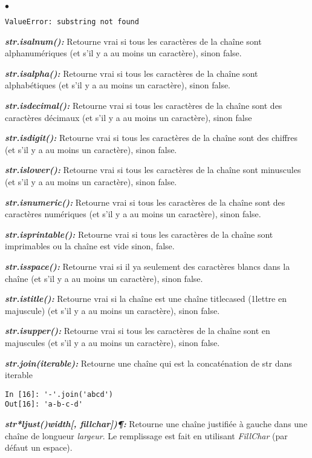 \documentclass[10pt,dvipsnames,  dvips]{article}
\begin{document}
\begin{list}{$\bullet$}{}
\begin{lstlisting}
ValueError: substring not found
\end{lstlisting}

\item \textit{\textbf{str.isalnum(): }} Retourne vrai si tous les caractères de la chaîne sont alphanumériques (et s'il y a au moins un caractère), sinon false.
\item \textit{\textbf{str.isalpha(): }} Retourne vrai si tous les caractères de la chaîne sont alphabétiques (et s'il y a au moins un caractère), sinon false.
\item \textit{\textbf{str.isdecimal(): }} Retourne vrai si tous les caractères de la chaîne sont des caractères décimaux (et s'il y a au moins un caractère), sinon false
\item \textit{\textbf{str.isdigit(): }} Retourne vrai si tous les caractères de la chaîne sont des chiffres (et s'il y a au moins un caractère), sinon false.
\item \textit{\textbf{str.islower(): }}Retourne vrai si tous les caractères de la chaîne sont minuscules (et s'il y a au moins un caractère), sinon false.
\item \textit{\textbf{str.isnumeric(): }}Retourne vrai si tous les caractères de la chaîne sont des caractères numériques (et s'il y a au moins un caractère), sinon false.
\item \textit{\textbf{str.isprintable(): }}Retourne vrai si tous les caractères de la chaîne sont imprimables ou la chaîne est vide sinon, false.
\item \textit{\textbf{str.isspace(): }}Retourne vrai si il ya seulement des caractères blancs dans la chaîne (et s'il y a au moins un caractère), sinon false.
\item \textit{\textbf{str.istitle(): }}Retourne vrai si la chaîne est une chaîne titlecased (1\ier lettre en majuscule) (et s'il y a au moins un caractère), sinon false.
\item \textit{\textbf{str.isupper(): }}Retourne vrai si tous les caractères de la chaîne sont en majuscules (et s'il y a au moins un caractère), sinon false.
\item \textit{\textbf{str.join(iterable): }}Retourne une chaîne qui est la concaténation de str dans iterable
\begin{lstlisting}
In [16]: '-'.join('abcd')
Out[16]: 'a-b-c-d'
\end{lstlisting}
\item \textit{\textbf{ str*ljust()width[, fillchar])¶: }} Retourne une chaîne justifiée à gauche dans une chaîne de longueur \textit{largeur}. Le remplissage est fait en utilisant \textit{FillChar} (par défaut un espace).

\end{list}
\end{document}

